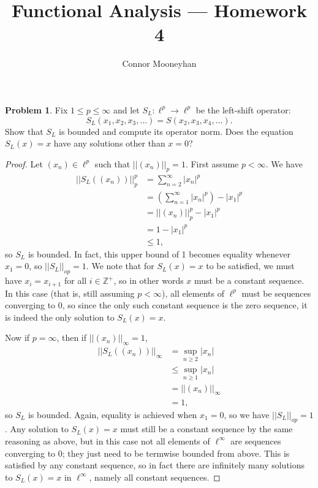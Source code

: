 \documentclass[12pt]{article}
\title{Functional Analysis --- Homework 4}
\author{Connor Mooneyhan}
\date{}
\theoremstyle{definition}
\newtheorem{ex}{Problem}
\begin{document}
\maketitle

\begin{ex}
	Fix $1 \leq p \leq \infty$ and let $S_L: \ell^p \to \ell^p$ be the left-shift operator: \begin{equation*}
		S_L(x_1, x_2, x_3, \dots) = S(x_2, x_3, x_4, \dots).
	\end{equation*}
	Show that $S_L$ is bounded and compute its operator norm.
	Does the equation $S_L(x) = x$ have any solutions other than $x = 0$?
\end{ex}
\begin{proof}
    Let $(x_n) \in \ell^p$ such that $||(x_n)||_p = 1$.
    First assume $p < \infty$.
    We have \begin{align*}
        ||S_L((x_n))||_p^p & = \sum_{n=2}^\infty |x_n|^p \\
                           & = \left(\sum_{n=1}^\infty |x_n|^p\right) - |x_1|^p \\
                           & = ||(x_n)||_p^p - |x_1|^p \\
                           & = 1 - |x_1|^p \\
                           & \leq 1,
    \end{align*} 
    so $S_L$ is bounded.
    In fact, this upper bound of 1 becomes equality whenever $x_1 = 0$, so $||S_L||_{op} = 1$.
    We note that for $S_L(x) = x$ to be satisfied, we must have $x_i = x_{i + 1}$ for all $i \in \mathbb{Z}^+$, so in other words $x$ must be a constant sequence.
    In this case (that is, still assuming $p < \infty$), all elements of $\ell^p$ must be sequences converging to 0, so since the only such constant sequence is the zero sequence, it is indeed the only solution to $S_L(x) = x$.

    Now if $p = \infty$, then if $||(x_n)||_\infty = 1$, \begin{align*}
        ||S_L((x_n))||_\infty & = \sup_{n \geq 2} |x_n| \\
                              & \leq \sup_{n \geq 1} |x_n| \\
                              & = ||(x_n)||_\infty \\
                              & = 1,
    \end{align*}
    so $S_L$ is bounded.
    Again, equality is achieved when $x_1 = 0$, so we have $||S_L||_{op} = 1$.
    Any solution to $S_L(x) = x$ must still be a constant sequence by the same reasoning as above, but in this case not all elements of $\ell^\infty$ are sequences converging to 0; they just need to be termwise bounded from above.
    This is satisfied by any constant sequence, so in fact there are infinitely many solutions to $S_L(x) = x$ in $\ell^\infty$, namely all constant sequences.
\end{proof}
\end{document}
